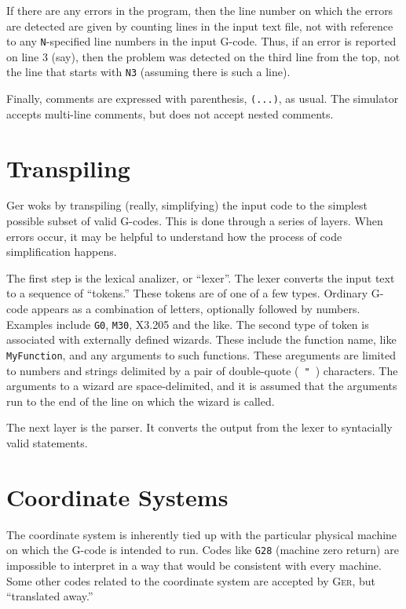 \documentclass[titlepage,oneside,10pt]{article}
\newcommand{\ger}{\textsc{Ger}}
\begin{document}
If there are any errors in the program, then the line number on
which the errors are detected are given by counting lines in the input
text file, not with reference to any {\tt N}-specified line numbers in
the input G-code. Thus, if an error is reported on line 3 (say), then the
problem was detected on the third line from the top, not the line that
starts with {\tt N3} (assuming there is such a line).

Finally, comments are expressed with parenthesis, {\tt (...)}, as
usual. The simulator accepts multi-line comments, but does not accept
nested comments.


\vskip 2cm

\section{Transpiling}

Ger woks by transpiling (really, simplifying) the input code to
the simplest possible subset of valid G-codes. This is done through a
series of layers. When errors occur, it may be helpful to
understand how the process of code simplification happens.

The first step is the lexical analizer, or ``lexer''. The lexer
converts the input text to a sequence of ``tokens.'' These tokens are
of one of a few types. Ordinary G-code appears as a combination of
letters, optionally followed by numbers. Examples include {\tt G0},
{\tt M30}, {X3.205} and the like. The second type of token is
associated with externally defined wizards. These include the
function name, like {\tt MyFunction}, and any arguments to such
functions. These areguments are limited to numbers and strings
delimited by a pair of double-quote (\ {\tt "}\ ) characters. The
arguments to a wizard are space-delimited, and it is assumed that
the arguments run to the end of the line on which the wizard is
called.

The next layer is the parser. It converts the output from the lexer to
syntacially valid statements. 

\section{Coordinate Systems}

The coordinate system is inherently tied up with the particular
physical machine on which the G-code is intended to run. Codes like
{\tt G28} (machine zero return) are impossible to interpret in a way
that would be consistent with every machine. Some other codes related to
the coordinate system are accepted by \ger, but ``translated away.''
\end{document}
